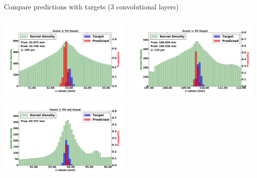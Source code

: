 \begin{frame}{Compare predictions with targets (3 convolutional layers)}
  \begin{columns}[c]
        \begin{center}
            \includegraphics[width=1\textwidth,height=0.45\textwidth, trim=18 0 18 0]{images/120000_3layer_04.pdf}

            \includegraphics[width=1\textwidth, height=0.45\textwidth,trim=18 0 18 0]{images/120000_3layer_05.pdf}

        \end{center}
        \begin{center}
           \includegraphics[width=1\textwidth, height=0.45\textwidth, trim=18 0 18 0]{images/120000_3layer_06.pdf}


\end{center}
\end{columns}
\end{frame}
